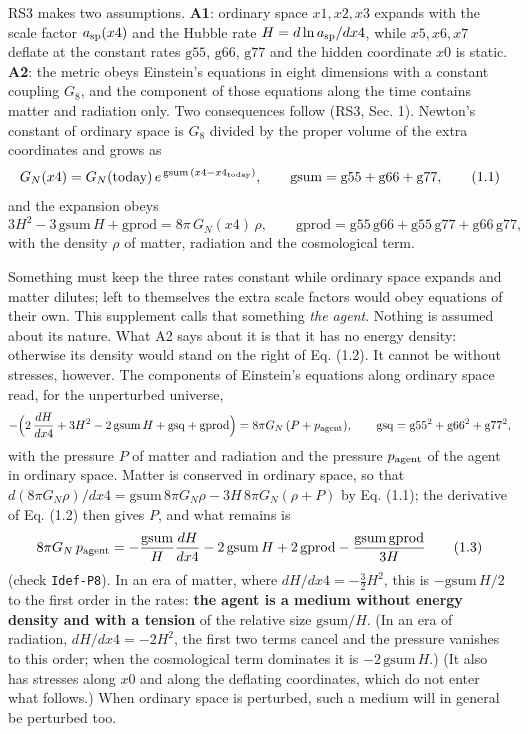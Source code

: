 \documentclass[
  10pt,
]{article}
\begin{document}
RS3 makes two assumptions. \textbf{A1}: ordinary space \(x1,x2,x3\)
expands with the scale factor \(a_{\rm sp}(x4)\) and the Hubble rate
\(H=d\ln a_{\rm sp}/dx4\), while \(x5,x6,x7\) deflate at the constant
rates \(\mathrm{g55}\), \(\mathrm{g66}\), \(\mathrm{g77}\) and the
hidden coordinate \(x0\) is static. \textbf{A2}: the metric obeys
Einstein's equations in eight dimensions with a constant coupling
\(G_8\), and the component of those equations along the time contains
matter and radiation only. Two consequences follow (RS3, Sec. 1).
Newton's constant of ordinary space is \(G_8\) divided by the proper
volume of the extra coordinates and grows as
\[G_N(x4)=G_N(\text{today})\,e^{\,\mathrm{gsum}\,(x4-x4_{\rm today})},\qquad \mathrm{gsum}=\mathrm{g55}+\mathrm{g66}+\mathrm{g77},\tag{1.1}\]
and the expansion obeys
\[3H^2-3\,\mathrm{gsum}\,H+\mathrm{gprod}=8\pi\,G_N(x4)\,\rho,\qquad \mathrm{gprod}=\mathrm{g55}\,\mathrm{g66}+\mathrm{g55}\,\mathrm{g77}+\mathrm{g66}\,\mathrm{g77},\tag{1.2}\]
with the density \(\rho\) of matter, radiation and the cosmological
term.

Something must keep the three rates constant while ordinary space
expands and matter dilutes; left to themselves the extra scale factors
would obey equations of their own. This supplement calls that something
\emph{the agent}. Nothing is assumed about its nature. What A2 says
about it is that it has no energy density: otherwise its density would
stand on the right of Eq. (1.2). It cannot be without stresses, however.
The components of Einstein's equations along ordinary space read, for
the unperturbed universe,
\[-\Big(2\,\frac{dH}{dx4}+3H^2-2\,\mathrm{gsum}\,H+\mathrm{gsq}+\mathrm{gprod}\Big)=8\pi G_N\,(P+p_{\rm agent}),\qquad\mathrm{gsq}=\mathrm{g55}^2+\mathrm{g66}^2+\mathrm{g77}^2,\]
with the pressure \(P\) of matter and radiation and the pressure
\(p_{\rm agent}\) of the agent in ordinary space. Matter is conserved in
ordinary space, so that
\(d(8\pi G_N\rho)/dx4=\mathrm{gsum}\,8\pi G_N\rho-3H\,8\pi G_N(\rho+P)\)
by Eq. (1.1); the derivative of Eq. (1.2) then gives \(P\), and what
remains is
\[8\pi G_N\,p_{\rm agent}=-\frac{\mathrm{gsum}}{H}\frac{dH}{dx4}-2\,\mathrm{gsum}\,H+2\,\mathrm{gprod}-\frac{\mathrm{gsum}\,\mathrm{gprod}}{3H}\tag{1.3}\]
(check \texttt{Idef-P8}). In an era of matter, where
\(dH/dx4=-\tfrac32H^2\), this is \(-\mathrm{gsum}\,H/2\) to the first
order in the rates: \textbf{the agent is a medium without energy density
and with a tension} of the relative size \(\mathrm{gsum}/H\). (In an era
of radiation, \(dH/dx4=-2H^2\), the first two terms cancel and the
pressure vanishes to this order; when the cosmological term dominates it
is \(-2\,\mathrm{gsum}\,H\).) (It also has stresses along \(x0\) and
along the deflating coordinates, which do not enter what follows.) When
ordinary space is perturbed, such a medium will in general be perturbed
too.
\end{document}
